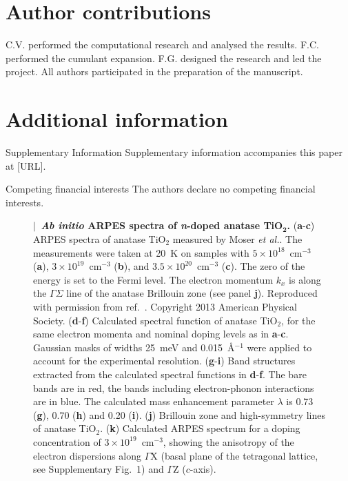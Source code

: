 \documentclass[12pt]{nature}
\begin{document}
\section*{\textsf{Author contributions}} \vspace*{-10pt}
C.V. performed the computational research and analysed the results. 
F.C. performed the cumulant expansion. 
F.G. designed the research and led the project. 
All authors participated in the preparation of the manuscript. 

\section*{\textsf{Additional information}} \vspace*{-10pt}
\begin{addendum}
\item[Supplementary Information]  
Supplementary information accompanies this paper at [URL]. \vspace*{-14pt}
\item[Competing financial interests] The authors declare no competing financial interests.
\end{addendum} 

\clearpage

\small
  \begin{figure}
  \caption{\label{fig1}
  \textbf{$\!\!\bm|\,$ \textit{Ab initio} ARPES spectra of \textit{n}-doped anatase TiO$_{\textbf{2}}$.}
  \normalfont(\textbf{a}-\textbf{c}) ARPES spectra of anatase TiO$_2$ measured by Moser \textit{et al.}\cite{Moser2013}.
  The measurements were taken at 20~K on samples with $5\times10^{18}$~cm$^{-3}$ (\textbf{a}),
  $3\times10^{19}$~cm$^{-3}$ (\textbf{b}), and $3.5\times10^{20}$~cm$^{-3}$ (\textbf{c}). The
  zero of the energy is set to the Fermi level. The electron momentum $k_x$ is along the 
  $\Gamma\Sigma$ line of the anatase Brillouin zone (see panel {\bf j}). Reproduced with permission from 
  ref.~. Copyright 2013 American Physical Society. 
  (\textbf{d}-\textbf{f}) Calculated spectral function of anatase TiO$_2$, for the same electron momenta 
  and nominal doping levels as in \textbf{a}-\textbf{c}.
  Gaussian masks of widths 25~meV and 0.015~\AA$^{-1}$ were applied to account for the experimental
  resolution\cite{Moser2013}. (\textbf{g}-\textbf{i}) Band structures extracted from the calculated 
  spectral functions in \textbf{d}-\textbf{f}. The bare bands are in red, the bands including electron-phonon 
  interactions are in blue. The calculated mass enhancement parameter $\lambda$ is 0.73 (\textbf{g}), 
  0.70 (\textbf{h}) and 0.20 (\textbf{i}). 
  (\textbf{j}) Brillouin zone and high-symmetry lines of anatase TiO$_2$.
  (\textbf{k}) Calculated ARPES spectrum for a doping concentration of $3\times10^{19}$~cm$^{-3}$, 
  showing the anisotropy of the electron dispersions along $\Gamma$X (basal plane of the tetragonal 
  lattice, see Supplementary Fig.~1) and $\Gamma$Z ($c$-axis). }
  \end{figure}
\end{document}
